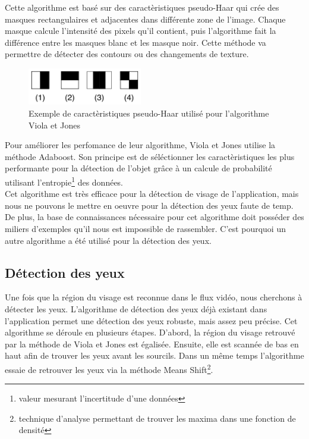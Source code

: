 Cette algorithme est basé sur des caractèristiques pseudo-Haar qui crée des masques rectangulaires et adjacentes
dans différente zone de l'image. Chaque masque calcule l'intensité des pixels qu'il contient, puis l'algorithme fait
la différence entre les masques blanc et les masque noir. Cette méthode va permettre de détecter des contours ou des changements de 
texture.\\

\begin{figure}[H]
\center
\includegraphics[width=5cm]{image/pseudo_haar.png}
\caption{Exemple de caractèristiques pseudo-Haar utilisé pour l'algorithme Viola et Jones}
\end{figure}

Pour améliorer les perfomance de leur algorithme, Viola et Jones utilise la méthode Adaboost. Son
principe est de séléctionner les caractèristiques les plus performante pour la détection de l'objet grâce à
un calcule de probabilité utilisant l'entropie\footnote{valeur mesurant l'incertitude d'une données} des données.\\

Cet algorithme est très efficace pour la détection de visage de l'application, mais nous ne pouvons le mettre
en oeuvre pour la détection des yeux faute de temp. De plus, la base de connaissances nécessaire pour cet 
algorithme doit posséder des miliers d'exemples qu'il nous est impossible de rassembler. C'est pourquoi
un autre algorithme a été utilisé pour la détection des yeux.

\subsection{Détection des yeux}
Une fois que la région du visage est reconnue dans le flux vidéo, nous cherchons à détecter les yeux. 
L'algorithme de détection des yeux déjà existant dans l'application permet une détection des yeux 
robuste, mais assez peu précise. Cet algorithme se déroule en plusieurs étapes. D'abord, la région du visage 
retrouvé par la méthode de Viola et Jones est égalisée. Ensuite, elle est scannée de bas en haut afin de
trouver les yeux avant les sourcils. Dans un même temps l'algorithme essaie de retrouver les yeux via la
méthode Means Shift\footnote{technique d'analyse permettant de trouver les maxima dans une fonction de densité}.\\



